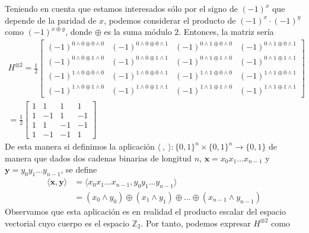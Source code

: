 \documentclass[a4paper]{article}
\numberwithin{equation}{section}
\begin{document}
Teniendo en cuenta que estamos interesados sólo por el signo de $(-1)^x$ que depende de la paridad de $x$, podemos considerar el producto de $(-1)^x\cdot(-1)^y$ como $(-1)^{x\oplus y}$, donde $\oplus$ es la suma módulo $2$. Entonces, la matriz sería
\begin{equation}
\begin{split}
H^{\otimes 2} =
\frac{1}{2}
\begin{bmatrix}
(-1)^{0\wedge 0\oplus 0\wedge 0} & (-1)^{0\wedge 0\oplus 0\wedge 1} & (-1)^{0\wedge 1\oplus 0\wedge 0} & (-1)^{0\wedge 1\oplus 0\wedge 1} 
\\
(-1)^{0\wedge 0\oplus 1\wedge 0} & (-1)^{0\wedge 0\oplus 1\wedge 1} & (-1)^{0\wedge 1\oplus 1\wedge 0} & (-1)^{0\wedge 1\oplus 1\wedge 1} 
\\
(-1)^{1\wedge 0\oplus 0\wedge 0} & (-1)^{1\wedge 0\oplus 0\wedge 1} & (-1)^{1\wedge 1\oplus 0\wedge 0} & (-1)^{1\wedge 1\oplus 0\wedge 1} 
\\
(-1)^{1\wedge 0\oplus 1\wedge 0} & (-1)^{1\wedge 0\oplus 1\wedge 1} & (-1)^{1\wedge 1\oplus 1\wedge 0} & (-1)^{1\wedge 1\oplus 1\wedge 1}
\end{bmatrix}
\\=
\frac{1}{2}
\begin{bmatrix}
1 & 1 & 1 & 1 \\
1 & -1 & 1 & -1 \\
1 & 1 & -1 & -1 \\
1 & -1 & -1 & 1
\end{bmatrix}
\end{split}
\end{equation}
De esta manera si definimos la aplicación $\langle \ , \ \rangle : \{0, 1\}^n \times \{0, 1\}^n \longrightarrow \{0, 1\}$ de manera que dados dos cadenas binarias de longitud $n$, $\mathbf{x} = x_0 x_1\ldots x_{n-1}$ y $\mathbf{y} = y_0 y_1\ldots y_{n-1}$, se define
\begin{equation}
\begin{split}
\langle \mathbf{x}, \mathbf{y} \rangle &= \langle x_0 x_1\ldots x_{n-1}, y_0 y_1\ldots y_{n-1} \rangle \\&= (x_0 \wedge y_0) \oplus (x_1 \wedge y_1) \oplus \ldots \oplus (x_{n-1} \wedge y_{n-1})
\end{split}
\end{equation}
Observamos que esta aplicación es en realidad el producto escalar del espacio vectorial cuyo cuerpo es el espacio $\mathbb{Z}_2$. Por tanto, podemos expresar $H^{\otimes 2}$ como
\end{document}
